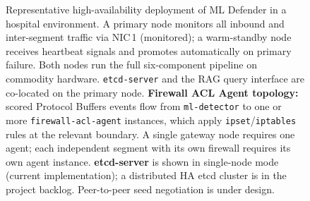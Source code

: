 \documentclass[11pt,a4paper]{article}
\begin{document}
\begin{figure}[ht]
        \caption{Representative high-availability deployment of ML Defender in a hospital environment.
        A primary node monitors all inbound and inter-segment traffic via NIC\,1 (monitored); a
        warm-standby node receives heartbeat signals and promotes automatically on primary failure.
        Both nodes run the full six-component pipeline on commodity hardware. \texttt{etcd-server}
        and the RAG query interface are co-located on the primary node.
        \textbf{Firewall ACL Agent topology:}
        scored Protocol Buffers events flow from \texttt{ml-detector} to one or more
        \texttt{firewall-acl-agent} instances, which apply \texttt{ipset}/\texttt{iptables} rules
        at the relevant boundary. A single gateway node requires one agent; each independent
        segment with its own firewall requires its own agent instance.
        \textbf{etcd-server} is shown in single-node mode (current implementation); a distributed
        HA etcd cluster is in the project backlog. Peer-to-peer seed negotiation is under design.}
        \label{fig:ha-deployment}
    \end{figure}
\end{document}
